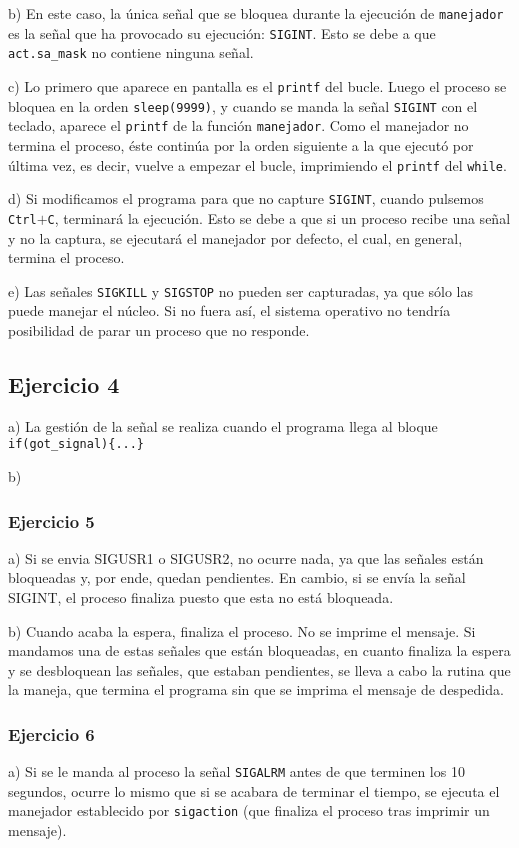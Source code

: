 \documentclass{article}
\begin{document}
b) En este caso, la única señal que se bloquea durante la ejecución de \texttt{manejador} es la señal que ha provocado su ejecución: \texttt{SIGINT}. Esto se debe a que \texttt{act.sa\_mask} no contiene ninguna señal.

c) Lo primero que aparece en pantalla es el \texttt{printf} del bucle. Luego el proceso se bloquea en la orden \texttt{sleep(9999)}, y cuando se manda la señal \texttt{SIGINT} con el teclado, aparece el \texttt{printf} de la función \texttt{manejador}. Como el manejador no termina el proceso, éste continúa por la orden siguiente a la que ejecutó por última vez, es decir, vuelve a empezar el bucle, imprimiendo el \texttt{printf} del \texttt{while}.

d) Si modificamos el programa para que no capture \texttt{SIGINT}, cuando pulsemos \texttt{Ctrl}$+$\texttt{C}, terminará la ejecución. Esto se debe a que si un proceso recibe una señal y no la captura, se ejecutará el manejador por defecto, el cual, en general, termina el proceso.

e) Las señales \texttt{SIGKILL} y \texttt{SIGSTOP} no pueden ser capturadas, ya que sólo las puede manejar el núcleo. Si no fuera así, el sistema operativo no tendría posibilidad de parar un proceso que no responde. 

\subsection*{Ejercicio 4}
a) La gestión de la señal se realiza cuando el programa llega al bloque \texttt{if(got\_signal)\{...\}}

b)

\subsubsection*{Ejercicio 5}
a) Si se envia SIGUSR1 o SIGUSR2, no ocurre nada, ya que las señales están bloqueadas y, por ende, quedan pendientes. En cambio, si se envía la señal SIGINT, el proceso finaliza puesto que esta no está bloqueada.

b) Cuando acaba la espera, finaliza el proceso. No se imprime el mensaje. Si mandamos una de estas señales que están bloqueadas, en cuanto finaliza la espera y se desbloquean las señales, que estaban pendientes, se lleva a cabo la rutina que la maneja, que termina el programa sin que se imprima el mensaje de despedida.

\subsubsection*{Ejercicio 6}
a) Si se le manda al proceso la señal \texttt{SIGALRM} antes de que terminen los 10 segundos, ocurre lo mismo que si se acabara de terminar el tiempo, se ejecuta el manejador establecido por \texttt{sigaction} (que finaliza el proceso tras imprimir un mensaje).
\end{document}
